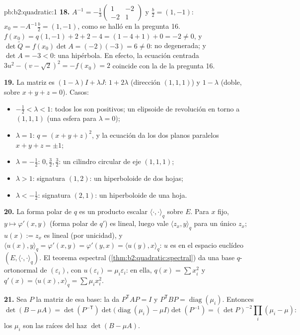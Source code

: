 \begin{solution}{pb:b2:quadratic:1}
\textbf{18.} $A^{-1} = -\frac13\begin{pmatrix} 1 & -2\\ -2 &
1\end{pmatrix}$ y $\frac b2 = (1, -1)$: $x_0 = -A^{-1}\frac b2 = (1,
-1)$, como se halló en la pregunta 16. $f(x_0) = q(1,-1) + 2 + 2 - 4 =
(1 - 4 + 1) + 0 = -2 \neq 0$, y $\det\widetilde Q = f(x_0)\det A =
(-2)(-3) = 6 \neq 0$: no degenerada; y $\det A = -3 < 0$: una
hipérbola. En efecto, la ecuación centrada $3u^2 - (v - \sqrt2)^2 =
-f(x_0) = 2$ coincide con la de la pregunta 16.

\textbf{19.} La matriz es $(1-\lambda)I + \lambda J$: 
$1 + 2\lambda$ (dirección $(1,1,1)$) y $1 - \lambda$ (doble, sobre $x +
y + z = 0$). Casos:
\begin{itemize}
  \item $-\frac12 < \lambda < 1$: todos los  son
        positivos; un elipsoide de revolución en torno a $(1,1,1)$
        (una esfera para $\lambda = 0$);
  \item $\lambda = 1$: $q = (x+y+z)^2$, y la ecuación da los dos
        planos paralelos $x + y + z = \pm1$;
  \item $\lambda = -\frac12$:  $0, \frac32,
        \frac32$: un cilindro circular de eje $(1,1,1)$;
  \item $\lambda > 1$: signatura $(1, 2)$: un hiperboloide de dos
        hojas;
  \item $\lambda < -\frac12$: signatura $(2, 1)$: un hiperboloide de
        una hoja.
\end{itemize}

\textbf{20.} La forma polar de $q$ es un producto escalar
$\langle\cdot,\cdot\rangle_q$ sobre $E$. Para $x$ fijo, $y \mapsto
\varphi'(x, y)$ (forma polar de $q'$) es lineal, luego vale $\langle
z_x, y\rangle_q$ para un único $z_x$; $u(x) := z_x$ es lineal (por
unicidad), y $\langle u(x), y\rangle_q = \varphi'(x,y) = \varphi'(y,x)
= \langle u(y), x\rangle_q$: $u$ es  en el espacio euclídeo
$(E, \langle\cdot,\cdot\rangle_q)$. El teorema espectral
(\cref{thm:b2:quadratic:spectral}) da una base $q$-ortonormal de
 $(\varepsilon_i)$, con $u(\varepsilon_i) =
\mu_i\varepsilon_i$: en ella, $q(x) = \sum x_i^2$ y $q'(x) = \langle
u(x), x\rangle_q = \sum\mu_ix_i^2$.

\textbf{21.} Sea $P$ la matriz de esa base: la  da
$P^{\mathsf T}AP = I$ y $P^{\mathsf T}BP = \operatorname{diag}(\mu_i)$.
Entonces
\[
\det(B - \mu A) = \det(P^{-\mathsf T})
\det\bigl(\operatorname{diag}(\mu_i) - \mu I\bigr)
\det(P^{-1})
= (\det P)^{-2}\prod_i(\mu_i - \mu) :
\]
los $\mu_i$ son las raíces del haz $\det(B - \mu A)$.


\end{solution}
